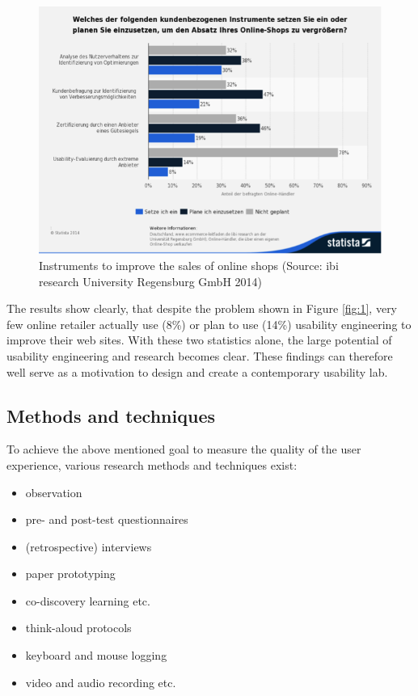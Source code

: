 \documentclass[output=paper]{langsci/langscibook}
\begin{document}
\begin{figure}[h]
 \includegraphics[width=\textwidth]{figures/Roesener2.png}
 \caption{Instruments to improve the sales of online shops (Source: ibi research University Regensburg GmbH 2014)}
 \label{fig:2}
\end{figure} 



The results show clearly, that despite the problem shown in Figure \ref{fig:1}, very few online retailer actually use (8\%) or plan to use (14\%) usability engineering to improve their web sites. With these two statistics alone, the large potential of usability engineering and research becomes clear. These findings can therefore well serve as a motivation to design and create a contemporary usability lab.

\subsection{Methods and techniques}

To achieve the above mentioned goal {\textquotedbl}to measure the quality of the user experience{\textquotedbl}, various research methods and techniques exist:

\begin{itemize}
\item observation
\item pre- and post-test questionnaires 
\item (retrospective) interviews 
\item paper prototyping 
\item co-discovery learning etc.
\item think-aloud protocols 
\item keyboard and mouse logging 
\item video and audio recording etc. 
\end{itemize}
\end{document}

